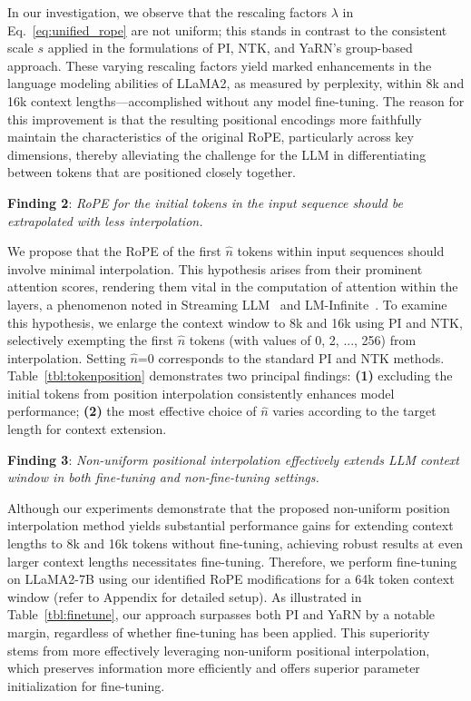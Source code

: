 In our investigation, we observe that the rescaling factors $\lambda$ in Eq.~\ref{eq:unified_rope} are not uniform; this stands in contrast to the consistent scale $s$ applied in the formulations of PI, NTK, and YaRN's group-based approach. These varying rescaling factors yield marked enhancements in the language modeling abilities of LLaMA2, as measured by perplexity, within 8k and 16k context lengths—accomplished without any model fine-tuning. The reason for this improvement is that the resulting positional encodings more faithfully maintain the characteristics of the original RoPE, particularly across key dimensions, thereby alleviating the challenge for the LLM in differentiating between tokens that are positioned closely together.

\textbf{Finding 2}: \textit{RoPE for the initial tokens in the input sequence should be extrapolated with less interpolation.} 

We propose that the RoPE of the first $\hat{n}$ tokens within input sequences should involve minimal interpolation. This hypothesis arises from their prominent attention scores, rendering them vital in the computation of attention within the layers, a phenomenon noted in Streaming LLM~\cite{streamingllm} and LM-Infinite~\cite{han2023lminfinite}. To examine this hypothesis, we enlarge the context window to 8k and 16k using PI and NTK, selectively exempting the first $\hat n$ tokens (with values of 0, 2, ..., 256) from interpolation. Setting $\hat n$=0 corresponds to the standard PI and NTK methods. Table~\ref{tbl:tokenposition} demonstrates two principal findings: \textbf{(1)} excluding the initial tokens from position interpolation consistently enhances model performance; \textbf{(2)} the most effective choice of $\hat n$ varies according to the target length for context extension.

\textbf{Finding 3}: \textit{Non-uniform positional interpolation effectively extends LLM context window in both fine-tuning and non-fine-tuning settings.} 

Although our experiments demonstrate that the proposed non-uniform position interpolation method yields substantial performance gains for extending context lengths to 8k and 16k tokens without fine-tuning, achieving robust results at even larger context lengths necessitates fine-tuning. Therefore, we perform fine-tuning on LLaMA2-7B using our identified RoPE modifications for a 64k token context window (refer to Appendix for detailed setup). As illustrated in Table~\ref{tbl:finetune}, our approach surpasses both PI and YaRN by a notable margin, regardless of whether fine-tuning has been applied. This superiority stems from more effectively leveraging non-uniform positional interpolation, which preserves information more efficiently and offers superior parameter initialization for fine-tuning.

